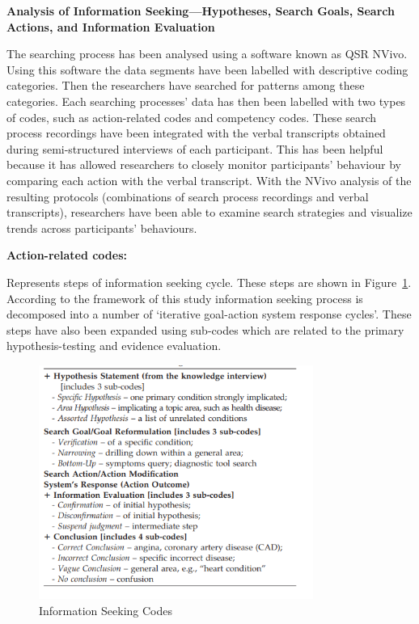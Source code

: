 \documentclass[]{article}
\begin{document}
\textbf{Analysis of Information Seeking—Hypotheses, Search Goals, Search Actions, and Information Evaluation}

The searching process has been analysed using a software known as QSR NVivo. Using this software the data segments have been labelled with descriptive coding categories. Then the researchers have searched for patterns among these categories. Each searching processes’ data has then been labelled with two types of codes, such as action-related codes and competency codes. These search process recordings have been integrated with the verbal transcripts obtained during semi-structured interviews of each participant. This has been helpful because it has allowed researchers to closely monitor participants’ behaviour by comparing each action with the verbal transcript. With the NVivo analysis of the resulting protocols (combinations of search process recordings and verbal transcripts), researchers have been able to examine search strategies and visualize trends across participants’ behaviours.   

\textbf{Action-related codes:}

Represents steps of information seeking cycle. These steps are shown in Figure~\ref{fig8}. According to the framework of this study information seeking process is decomposed into a number of ‘iterative goal-action system response cycles’. These steps have also been expanded using sub-codes which are related to the primary hypothesis-testing and evidence evaluation.    

\begin{figure}[t!]
	\includegraphics[width=0.8\textwidth]{Capture8.png}
	\caption{Information Seeking Codes\label{fig8}}
\end{figure}
\end{document}
